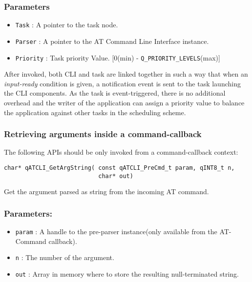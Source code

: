 \subsubsection*{Parameters}
\begin{itemize}
    \item \lstinline{Task} : A pointer to the task node. 
    \item \lstinline{Parser} :  A pointer to the AT Command Line Interface instance.
    \item \lstinline{Priority} : Task priority Value. [0(min) - \lstinline{Q_PRIORITY_LEVELS}(max)]
\end{itemize}

After invoked, both CLI and task are linked together in such a way that when an \textit{input-ready} condition is given, a notification event is sent to the task launching the CLI components. As the task is event-triggered, there is no additional overhead and the writer of the application can assign a priority value to balance the application against other tasks in the scheduling scheme.

\subsubsection{Retrieving arguments inside a command-callback}

The following APIs should be only invoked from a command-callback context:
\medskip

\begin{lstlisting}[style=CStyle]
char* qATCLI_GetArgString( const qATCLI_PreCmd_t param, qINT8_t n,
                           char* out)
\end{lstlisting}

Get the argument parsed as string from the incoming AT command. 

\subsubsection*{Parameters:}
\begin{itemize}
    \item \lstinline{param} : A handle to the pre-parser instance(only available from the AT-Command callback).
    \item \lstinline{n} : The number of the argument.
    \item \lstinline{out} :  Array in memory where to store the resulting null-terminated string.
\end{itemize}


